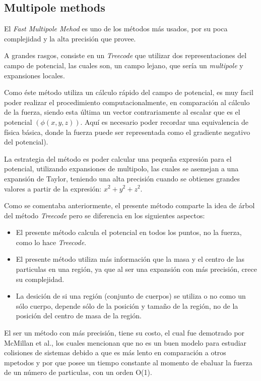\subsection{Multipole methods}

El \emph{Fast Multipole Mehod} es uno de los métodos
más usados, por su poca complejidad y la alta precisión que provee.

A grandes rasgos, consiste en un \emph{Treecode} que utilizar
dos representaciones del campo de potencial,
las cuales son, un campo lejano, que sería un \emph{multipole}
y expansiones locales.

Como éste método utiliza un cálculo rápido del campo de potencial,
es muy facil poder realizar el procedimiento computacionalmente,
en comparación al cálculo de la fuerza, siendo esta última
un vector contrariamente al escalar que es el potencial $(\phi (x,y,z))$.
Aquí es necesario poder recordar una equivalencia de física
básica, donde la fuerza puede ser representada como el gradiente
negativo del potencial).

La estrategia del método es poder calcular una pequeña expresión
para el potencial, utilizando expansiones de multipolo, las
cuales se asemejan a una expansión de Taylor,
teniendo una alta precisión cuando se obtienes grandes
valores a partir de la expresión: $x^{2} + y^{2} + z^{2}$.

Como se comentaba anteriormente,
el presente método comparte la idea de árbol del método \emph{Treecode}
pero se diferencia en los siguientes aspectos:

\begin{itemize}
	\item El presente método calcula el potencial en todos los puntos,
		no la fuerza, como lo hace \emph{Treecode}.
	\item El presente método utiliza más información que la masa
		y el centro de las particulas en una región, ya que al ser
		una expansión con más precisión, crece su complejidad.
	\item La desición de si una región (conjunto de cuerpos) se utiliza o no
		como un sólo cuerpo, depende sólo de la posición y tamaño
		de la región, no de la posición del centro de masa de la región.
\end{itemize}

El ser un método con más precisión, tiene su costo,
el cual fue demotrado por McMillan et al., %
los cuales mencionan que no es un buen modelo para estudiar colisiones de sistemas
debido a que es más lento en comparación a otros mpetodos y
por que posee un tiempo constante al momento de ebaluar la fuerza de un número
de particulas, con un orden O(1).

